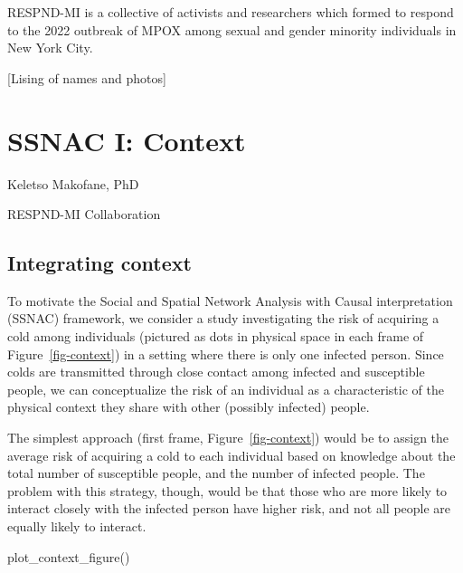 \documentclass[
  letterpaper,
  DIV=11,
  numbers=noendperiod,
  oneside]{scrreprt}
\newenvironment{Shaded}{\begin{snugshade}}{\end{snugshade}}
\newcommand{\FunctionTok}[1]{\textcolor[rgb]{0.28,0.35,0.67}{#1}}
\newcommand{\NormalTok}[1]{\textcolor[rgb]{0.00,0.23,0.31}{#1}}
\begin{document}
RESPND-MI is a collective of activists and researchers which formed to
respond to the 2022 outbreak of MPOX among sexual and gender minority
individuals in New York City.

{[}Lising of names and photos{]}

\cleardoublepage
{}
{}
\appendix

\hypertarget{sec-appendix-social-spatial}{%
\chapter{SSNAC I: Context}\label{sec-appendix-social-spatial}}

\leavevmode{}%
Keletso Makofane, PhD

RESPND-MI Collaboration

\hypertarget{integrating-context}{%
\section*{Integrating context}\label{integrating-context}}


To motivate the Social and Spatial Network Analysis with Causal
interpretation (SSNAC) framework, we consider a study investigating the
risk of acquiring a cold among individuals (pictured as dots in physical
space in each frame of Figure~\ref{fig-context}) in a setting where
there is only one infected person. Since colds are transmitted through
close contact among infected and susceptible people, we can
conceptualize the risk of an individual as a characteristic of the
physical context they share with other (possibly infected) people.

The simplest approach (first frame, Figure~\ref{fig-context}) would be
to assign the average risk of acquiring a cold to each individual based
on knowledge about the total number of susceptible people, and the
number of infected people. The problem with this strategy, though, would
be that those who are more likely to interact closely with the infected
person have higher risk, and not all people are equally likely to
interact.

\begin{Shaded}
\begin{Highlighting}[]
\FunctionTok{plot\_context\_figure}\NormalTok{()}
\end{Highlighting}
\end{Shaded}
\end{document}
